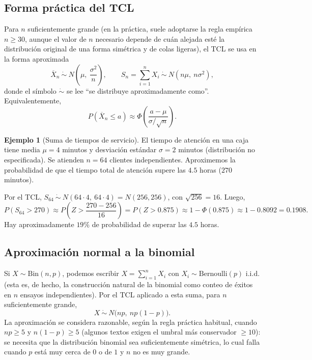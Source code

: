 \documentclass[11pt,a4paper]{article}
\theoremstyle{plain}
\theoremstyle{definition}
\newtheorem{ejemplo}[teorema]{Ejemplo}
\theoremstyle{remark}
\begin{document}
\subsection{Forma práctica del TCL}

Para $n$ suficientemente grande (en la práctica, suele adoptarse la regla empírica $n\geq30$, aunque el valor de $n$ necesario depende de cuán alejada esté la distribución original de una forma simétrica y de colas ligeras), el TCL se usa en la forma aproximada
\[
\overline{X}_n \ \dot\sim\ N\left(\mu,\ \frac{\sigma^2}{n}\right), \qquad S_n = \sum_{i=1}^n X_i \ \dot\sim\ N(n\mu,\ n\sigma^2),
\]
donde el símbolo $\dot\sim$ se lee ``se distribuye aproximadamente como''. Equivalentemente,
\[
P(\overline{X}_n\leq a) \approx \Phi\left(\frac{a-\mu}{\sigma/\sqrt n}\right).
\]

\begin{ejemplo}[Suma de tiempos de servicio]
El tiempo de atención en una caja tiene media $\mu=4$ minutos y desviación estándar $\sigma=2$ minutos (distribución no especificada). Se atienden $n=64$ clientes independientes. Aproximemos la probabilidad de que el tiempo total de atención supere las $4.5$ horas ($270$ minutos).

Por el TCL, $S_{64}\ \dot\sim\ N(64\cdot4,\ 64\cdot4)=N(256,256)$, con $\sqrt{256}=16$. Luego,
\[
P(S_{64}>270) \approx P\left(Z>\frac{270-256}{16}\right) = P(Z>0.875) \approx 1-\Phi(0.875) \approx 1-0.8092 = 0.1908.
\]
Hay aproximadamente $19\%$ de probabilidad de superar las $4.5$ horas.
\end{ejemplo}

\subsection{Aproximación normal a la binomial}

Si $X\sim\text{Bin}(n,p)$, podemos escribir $X=\sum_{i=1}^n X_i$ con $X_i\sim\text{Bernoulli}(p)$ i.i.d. (esta es, de hecho, la construcción natural de la binomial como conteo de éxitos en $n$ ensayos independientes). Por el TCL aplicado a esta suma, para $n$ suficientemente grande,
\[
X\ \dot\sim\ N\big(np,\ np(1-p)\big).
\]
La aproximación se considera razonable, según la regla práctica habitual, cuando $np\geq5$ y $n(1-p)\geq5$ (algunos textos exigen el umbral más conservador $\geq10$): se necesita que la distribución binomial sea suficientemente simétrica, lo cual falla cuando $p$ está muy cerca de $0$ o de $1$ y $n$ no es muy grande.
\end{document}
